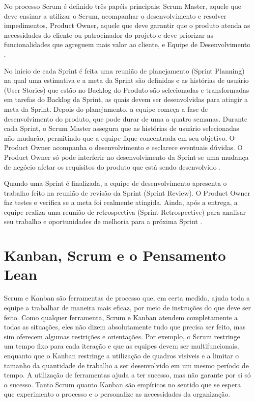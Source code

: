 No processo Scrum é definido três papéis principais: Scrum Master, aquele que deve ensinar a utilizar o Scrum, acompanhar o desenvolvimento e resolver impedimentos, Product Owner, aquele que deve garantir que o produto atenda as necessidades do cliente ou patrocinador do projeto e deve priorizar as funcionalidades que agreguem mais valor ao cliente, e Equipe de Desenvolvimento   \cite{jeff}. 

No início de cada Sprint é feita uma reunião de planejamento (Sprint Planning) na qual uma estimativa e a meta da Sprint são definidas e as histórias de usuário (User Stories) que estão no Backlog do Produto são selecionadas e transformadas em tarefas do Backlog da Sprint, as quais devem ser desenvolvidas para atingir a meta da Sprint. Depois do planejamento, a equipe começa a fase de desenvolvimento do produto, que pode durar de uma a quatro semanas. Durante cada Sprint, o Scrum Master assegura que as histórias de usuário selecionadas não mudarão, permitindo que a equipe fique concentrada em seu objetivo. O Product Owner acompanha o desenvolvimento e esclarece eventuais dúvidas. O Product Owner só pode interferir no desenvolvimento da Sprint se uma mudança de negócio afetar os requisitos do produto que está sendo desenvolvido  \cite{jeff}.

Quando uma Sprint é finalizada, a equipe de desenvolvimento apresenta o trabalho feito na reunião de revisão da Sprint (Sprint Review). O Product Owner faz testes e verifica se a meta foi realmente atingida. Ainda, após a entrega, a equipe realiza uma reunião de retrospectiva (Sprint Retrospective) para analisar seu trabalho e oportunidades de melhoria para a próxima Sprint   \cite{jeff}. 

\section[Kanban, Scrum e o Pensamento Lean ]{Kanban, Scrum e o Pensamento Lean }

Scrum e Kanban são ferramentas de processo que, em certa medida, ajuda toda a equipe a trabalhar de maneira mais eficaz, por meio de instruções do que deve ser feito. Como qualquer ferramenta, Scrum e Kanban atendem completamente a todas as situações, eles não dizem absolutamente tudo que precisa ser feito, mas sim oferecem algumas restrições e orientações. Por exemplo, o Scrum restringe um tempo fixo para cada iteração e que as equipes devem ser multifuncionais, enquanto que o Kanban restringe a utilização de quadros visíveis e a limitar o tamanho da quantidade de trabalho a ser desenvolvido em um mesmo período de tempo. A utilização de ferramentas ajuda a ter sucesso, mas não garante por si só o sucesso. Tanto Scrum quanto Kanban são empíricos no sentido que se espera que experimento o processo e o personalize as necessidades da organização.

